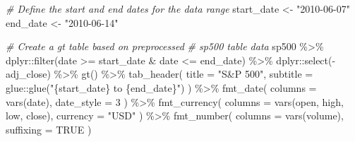\documentclass[
]{article}
\newenvironment{Shaded}{}{}
\newcommand{\AttributeTok}[1]{\textcolor[rgb]{0.49,0.56,0.16}{#1}}
\newcommand{\CommentTok}[1]{\textcolor[rgb]{0.38,0.63,0.69}{\textit{#1}}}
\newcommand{\ConstantTok}[1]{\textcolor[rgb]{0.53,0.00,0.00}{#1}}
\newcommand{\DecValTok}[1]{\textcolor[rgb]{0.25,0.63,0.44}{#1}}
\newcommand{\FunctionTok}[1]{\textcolor[rgb]{0.02,0.16,0.49}{#1}}
\newcommand{\NormalTok}[1]{#1}
\newcommand{\OtherTok}[1]{\textcolor[rgb]{0.00,0.44,0.13}{#1}}
\newcommand{\SpecialCharTok}[1]{\textcolor[rgb]{0.25,0.44,0.63}{#1}}
\newcommand{\StringTok}[1]{\textcolor[rgb]{0.25,0.44,0.63}{#1}}
\begin{document}
\begin{Shaded}
\begin{Highlighting}[]
\CommentTok{\# Define the start and end dates for the data range}
\NormalTok{start\_date }\OtherTok{\textless{}{-}} \StringTok{"2010{-}06{-}07"}
\NormalTok{end\_date }\OtherTok{\textless{}{-}} \StringTok{"2010{-}06{-}14"}

\CommentTok{\# Create a gt table based on preprocessed}
\CommentTok{\# \textasciigrave{}sp500\textasciigrave{} table data}
\NormalTok{sp500 }\SpecialCharTok{\%\textgreater{}\%}
\NormalTok{  dplyr}\SpecialCharTok{::}\FunctionTok{filter}\NormalTok{(date }\SpecialCharTok{\textgreater{}=}\NormalTok{ start\_date }\SpecialCharTok{\&}\NormalTok{ date }\SpecialCharTok{\textless{}=}\NormalTok{ end\_date) }\SpecialCharTok{\%\textgreater{}\%}
\NormalTok{  dplyr}\SpecialCharTok{::}\FunctionTok{select}\NormalTok{(}\SpecialCharTok{{-}}\NormalTok{adj\_close) }\SpecialCharTok{\%\textgreater{}\%}
  \FunctionTok{gt}\NormalTok{() }\SpecialCharTok{\%\textgreater{}\%}
  \FunctionTok{tab\_header}\NormalTok{(}
    \AttributeTok{title =} \StringTok{"S\&P 500"}\NormalTok{,}
    \AttributeTok{subtitle =}\NormalTok{ glue}\SpecialCharTok{::}\FunctionTok{glue}\NormalTok{(}\StringTok{"\{start\_date\} to \{end\_date\}"}\NormalTok{)}
\NormalTok{  ) }\SpecialCharTok{\%\textgreater{}\%}
  \FunctionTok{fmt\_date}\NormalTok{(}
    \AttributeTok{columns =} \FunctionTok{vars}\NormalTok{(date),}
    \AttributeTok{date\_style =} \DecValTok{3}
\NormalTok{  ) }\SpecialCharTok{\%\textgreater{}\%}
  \FunctionTok{fmt\_currency}\NormalTok{(}
    \AttributeTok{columns =} \FunctionTok{vars}\NormalTok{(open, high, low, close),}
    \AttributeTok{currency =} \StringTok{"USD"}
\NormalTok{  ) }\SpecialCharTok{\%\textgreater{}\%}
  \FunctionTok{fmt\_number}\NormalTok{(}
    \AttributeTok{columns =} \FunctionTok{vars}\NormalTok{(volume),}
    \AttributeTok{suffixing =} \ConstantTok{TRUE}
\NormalTok{  )}
\end{Highlighting}
\end{Shaded}
\end{document}
